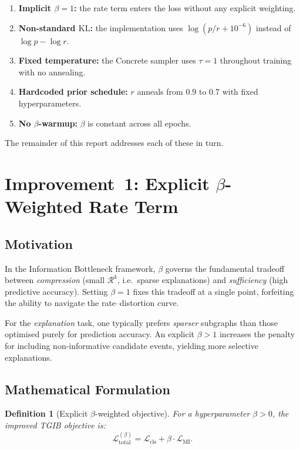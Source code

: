 \documentclass[11pt,a4paper]{article}
\newtheorem{definition}{Definition}
\newcommand{\R}{\mathcal{R}}
\newcommand{\KL}{\mathrm{KL}}
\newcommand{\loss}{\mathcal{L}}
\begin{document}
\begin{enumerate}[leftmargin=*,itemsep=2pt]
  \item \textbf{Implicit $\beta = 1$:} the rate term enters the loss
        without any explicit weighting.
  \item \textbf{Non-standard $\KL$:} the implementation uses
        $\log(p/r + 10^{-6})$ instead of $\log p - \log r$.
  \item \textbf{Fixed temperature:} the Concrete sampler uses
        $\tau = 1$ throughout training with no annealing.
  \item \textbf{Hardcoded prior schedule:} $r$ anneals from $0.9$
        to $0.7$ with fixed hyperparameters.
  \item \textbf{No $\beta$-warmup:} $\beta$ is constant across all
        epochs.
\end{enumerate}

The remainder of this report addresses each of these in turn.

\section{Improvement~1: Explicit $\beta$-Weighted Rate Term}
\label{sec:beta}

\subsection{Motivation}

In the Information Bottleneck framework, $\beta$ governs the fundamental
tradeoff between \emph{compression} (small $\R^k$, i.e.\ sparse
explanations) and \emph{sufficiency} (high predictive accuracy). Setting
$\beta = 1$ fixes this tradeoff at a single point, forfeiting the
ability to navigate the rate--distortion curve.

For the \emph{explanation} task, one typically prefers \emph{sparser}
subgraphs than those optimised purely for prediction accuracy. An
explicit $\beta > 1$ increases the penalty for including
non-informative candidate events, yielding more selective explanations.

\subsection{Mathematical Formulation}

\begin{definition}[Explicit $\beta$-weighted objective]
\label{def:beta_objective}
For a hyperparameter $\beta > 0$, the improved TGIB objective is:
\begin{equation}
\label{eq:beta_objective}
\loss_{\text{total}}^{(\beta)} = \loss_{\text{cls}} + \beta \cdot \loss_{\text{MI}}.
\end{equation}
\end{definition}
\end{document}
